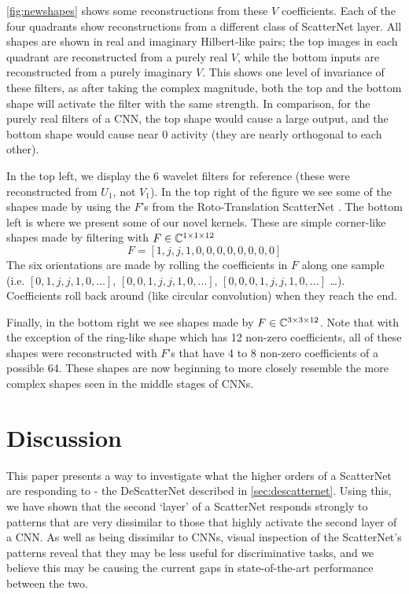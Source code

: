 \autoref{fig:newshapes} shows some reconstructions from these $V$ coefficients.
Each of the four quadrants show reconstructions from a different class of
ScatterNet layer. 
All shapes are shown in real and imaginary Hilbert-like pairs; the top images in
each quadrant are reconstructed from a purely real $V$, while the bottom inputs
are reconstructed from a purely imaginary $V$. This shows one level of invariance of
these filters, as after taking the complex magnitude, both the top and the
bottom shape will activate the filter with the same strength. In comparison, for
the purely real filters of a CNN, the top shape would cause a large output, and
the bottom shape would cause near 0 activity (they are nearly orthogonal to each
other).

In the top left, we display the 6 wavelet filters for reference (these were
reconstructed from $U_1$, not $V_1$). In the top right of the figure we see some
of the shapes made by using the $F$'s from the Roto-Translation ScatterNet
\cite{sifre_rotation_2013, oyallon_deep_2015}.  The bottom left is where we
present some of our novel kernels. These are simple corner-like shapes made 
by filtering with ${F\in \complexes[1\x 1\x 12]}$
\begin{equation}
\label{eq:simple_corner}
F = [1, j, j, 1, 0, 0, 0, 0, 0, 0, 0, 0]
\end{equation}
The six orientations are made by rolling the coefficients in $F$ along one
sample (i.e. $[0, 1, j, j, 1, 0,\ldots]$, $[0,0,1,j,j,1,0,\ldots]$,
$[0,0,0,1,j,j,1,0, \ldots]$ \ldots). Coefficients roll back around (like
circular convolution) when they reach the end.

Finally, in the bottom right we see shapes made by 
${F \in \complexes[3\x 3\x 12]}$. Note that with the exception of the 
ring-like shape which has 12 non-zero coefficients, all of these shapes were
reconstructed with $F$'s that have 4 to 8 non-zero coefficients of a possible 
64. These shapes are now beginning to more closely resemble the more complex
shapes seen in the middle stages of CNNs. 

\section{Discussion}
This paper presents a way to investigate what the higher orders of a ScatterNet
are responding to - the DeScatterNet described in \autoref{sec:descatternet}.
Using this, we have shown that the second `layer' of a ScatterNet 
responds strongly to patterns that are very dissimilar to those that highly activate the
second layer of a CNN\@. As well as being dissimilar to CNNs, visual inspection of the
ScatterNet's patterns reveal that they may be less useful for discriminative
tasks, and we believe this may be causing the current gaps in state-of-the-art
performance between the two. 

